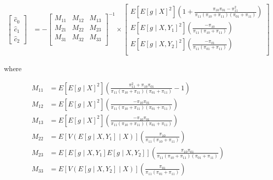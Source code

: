 \documentclass[12pt]{article}
\begin{document}
\begin{align*}
  \begin{bmatrix} \hat c_0 \\ \hat c_1 \\ \hat c_2 \end{bmatrix} 
  &= -
  \begin{bmatrix} 
    M_{11} & M_{12} & M_{13} \\
    M_{21} & M_{22} & M_{23} \\
    M_{31} & M_{32} & M_{33} \\
  \end{bmatrix}^{-1}
  \times 
  \begin{bmatrix}
    E[E[g \mid X]^2] \left(1 + \frac{\pi_{10}\pi_{01} - \pi_{11}^2}{\pi_{11}(\pi_{10} + \pi_{11})(\pi_{01} + \pi_{11})}\right) \\
    E[E[g \mid X, Y_1]^2] \left(\frac{-\pi_{10}}{\pi_{11}(\pi_{10} + \pi_{11})}\right) \\
    E[E[g \mid X, Y_2]^2] \left(\frac{-\pi_{01}}{\pi_{11}(\pi_{01} + \pi_{11})}\right) \\
  \end{bmatrix}
\end{align*}

where 

\begin{align*}
  M_{11} &= E[E[g \mid X]^2] \left(\frac{\pi_{11}^2 + \pi_{10}\pi_{01}}{\pi_{11}(\pi_{10} + \pi_{11})(\pi_{01} + \pi_{11})} - 1\right) \\
  M_{12} &= E[E[g \mid X]^2] \left(\frac{-\pi_{10}\pi_{01}}{\pi_{11}(\pi_{10} + \pi_{11})(\pi_{01} + \pi_{11})}\right) \\
  M_{13} &= E[E[g \mid X]^2] \left(\frac{-\pi_{10}\pi_{01}}{\pi_{11}(\pi_{10} + \pi_{11})(\pi_{01} + \pi_{11})}\right) \\
  M_{22} &= E[V(E[g \mid X, Y_1] \mid X)] \left(\frac{\pi_{10}}{\pi_{11}(\pi_{10} + \pi_{11})}\right) \\
  M_{23} &= E[E[g \mid X, Y_1]E[g \mid X, Y_2]] \left(\frac{\pi_{10}\pi_{01}}{\pi_{11}(\pi_{10} + \pi_{11})(\pi_{01} + \pi_{11})}\right) \\
  M_{33} &= E[V(E[g \mid X, Y_2] \mid X)] \left(\frac{\pi_{01}}{\pi_{11}(\pi_{01} + \pi_{11})}\right)
\end{align*}

\newpage 

\printbibliography
\end{document}
